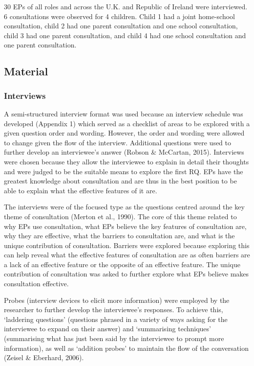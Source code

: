 \documentclass[
  english,
  man,floatsintext]{apa6}
\begin{document}
30 EPs of all roles and across the U.K. and Republic of Ireland were interviewed. 6 consultations were observed for 4 children. Child 1 had a joint home-school consultation, child 2 had one parent consultation and one school consultation, child 3 had one parent consultation, and child 4 had one school consultation and one parent consultation.

\hypertarget{material}{%
\subsection{Material}\label{material}}

\hypertarget{interviews}{%
\subsubsection{Interviews}\label{interviews}}

A semi-structured interview format was used because an interview
schedule was developed (Appendix 1) which served as a checklist of areas
to be explored with a given question order and wording. However, the
order and wording were allowed to change given the flow of the
interview. Additional questions were used to further develop an
interviewee's answer (Robson \& McCartan, 2015). Interviews were
chosen because they allow the interviewee to explain in detail their
thoughts and were judged to be the suitable means to explore the first
RQ. EPs have the greatest knowledge about consultation and are thus in
the best position to be able to explain what the effective features of
it are.

The interviews were of the focused type as the questions centred around
the key theme of consultation (Merton et al., 1990). The
core of this theme related to why EPs use consultation, what EPs believe
the key features of consultation are, why they are effective, what the
barriers to consultation are, and what is the unique contribution of
consultation. Barriers were explored because exploring this can help
reveal what the effective features of consultation are as often barriers
are a lack of an effective feature or the opposite of an effective
feature. The unique contribution of consultation was asked to further
explore what EPs believe makes consultation effective.

Probes (interview devices to elicit more information) were employed by
the researcher to further develop the interviewee's responses. To
achieve this, `laddering questions' (questions phrased in a variety of
ways asking for the interviewee to expand on their answer) and
`summarising techniques' (summarising what has just been said by the
interviewee to prompt more information), as well as `addition probes' to
maintain the flow of the conversation
(Zeisel \& Eberhard, 2006).
\end{document}
